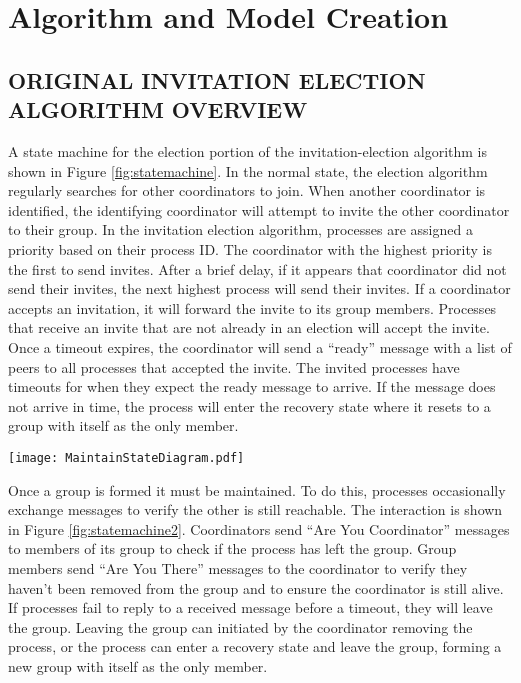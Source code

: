 \chapter{Algorithm and Model Creation}

\section{ORIGINAL INVITATION ELECTION ALGORITHM OVERVIEW}

A state machine for the election portion of the invitation-election algorithm is shown in Figure \ref{fig:statemachine}.
In the normal state, the election algorithm regularly searches for other coordinators to join.
When another coordinator is identified, the identifying coordinator will attempt to invite the other coordinator to their group.
In the invitation election algorithm, processes are assigned a priority based on their process ID.
The coordinator with the highest priority is the first to send invites.
After a brief delay, if it appears that coordinator did not send their invites, the next highest process will send their invites.
If a coordinator accepts an invitation, it will forward the invite to its group members.
Processes that receive an invite that are not already in an election will accept the invite.
Once a timeout expires, the coordinator will send a ``ready'' message with a list of peers to all processes that accepted the invite.
The invited processes have timeouts for when they expect the ready message to arrive.
If the message does not arrive in time, the process will enter the recovery state where it resets to a group with itself as the only member.

\begin{figure*}[!t]
\texttt{[image: MaintainStateDiagram.pdf]}
\caption[State machine for maintaining a group]{State machine for maintaining a group. The \ac{AYC} messages are the same as those in Figure \ref{fig:statemachine}. \ac{AYC} and \ac{AYT} are periodically sent by processes, and responses to those messages are immediately sent by the receiving process. In the modified algorithm, the member does not enter the recovery state if they do not receive an AYT response before the timeout expires.}
\label{fig:statemachine2}
\end{figure*}

Once a group is formed it must be maintained.
To do this, processes occasionally exchange messages to verify the other is still reachable.
The interaction is shown in Figure \ref{fig:statemachine2}.
Coordinators send ``Are You Coordinator'' messages to members of its group to check if the process has left the group.
Group members send ``Are You There'' messages to the coordinator to verify they haven't been removed from the group and to ensure the coordinator is still alive.
If processes fail to reply to a received message before a timeout, they will leave the group.
Leaving the group can initiated by the coordinator removing the process, or the process can enter a recovery state and leave the group, forming a new group with itself as the only member.

